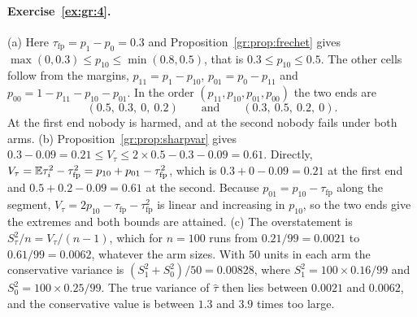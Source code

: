\paragraph{Exercise~\ref{ex:gr:4}.} (a) Here $\tau_{\mathrm{fp}}=p_1-p_0=0.3$ and Proposition~\ref{gr:prop:frechet} gives $\max(0,0.3)\le p_{10}\le\min(0.8,0.5)$, that is $0.3\le p_{10}\le0.5$. The other cells follow from the margins, $p_{11}=p_1-p_{10}$, $p_{01}=p_0-p_{11}$ and $p_{00}=1-p_{11}-p_{10}-p_{01}$. In the order $(p_{11},p_{10},p_{01},p_{00})$ the two ends are
\[
(0.5,\ 0.3,\ 0,\ 0.2)\qquad\text{and}\qquad(0.3,\ 0.5,\ 0.2,\ 0).
\]
At the first end nobody is harmed, and at the second nobody fails under both arms. (b) Proposition~\ref{gr:prop:sharpvar} gives $0.3-0.09=0.21\le V_\tau\le2\times0.5-0.3-0.09=0.61$. Directly, $V_\tau=\mathbb{E}\tau_i^2-\tau_{\mathrm{fp}}^2=p_{10}+p_{01}-\tau_{\mathrm{fp}}^2$, which is $0.3+0-0.09=0.21$ at the first end and $0.5+0.2-0.09=0.61$ at the second. Because $p_{01}=p_{10}-\tau_{\mathrm{fp}}$ along the segment, $V_\tau=2p_{10}-\tau_{\mathrm{fp}}-\tau_{\mathrm{fp}}^2$ is linear and increasing in $p_{10}$, so the two ends give the extremes and both bounds are attained. (c) The overstatement is $S_\tau^2/n=V_\tau/(n-1)$, which for $n=100$ runs from $0.21/99=0.0021$ to $0.61/99=0.0062$, whatever the arm sizes. With $50$ units in each arm the conservative variance is $(S_1^2+S_0^2)/50=0.00828$, where $S_1^2=100\times0.16/99$ and $S_0^2=100\times0.25/99$. The true variance of $\hat\tau$ then lies between $0.0021$ and $0.0062$, and the conservative value is between $1.3$ and $3.9$ times too large.

